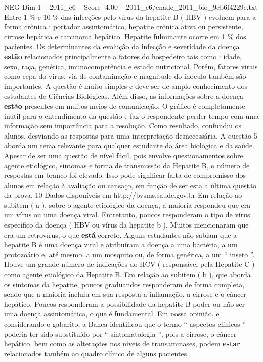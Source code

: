 \begin{textsample}{NEG Dim 1 – 2011\_c6 – Score -4.00 – 2011\_c6/enade\_2011\_bio\_9cb6f4229e.txt}
Entre 1 \% e 10 \% das infecções pelo vírus da hepatite B ( HBV ) evoluem para a forma crônica : portador assintomático, hepatite crônica ativa ou persistente, cirrose hepática e carcinoma hepático.
Hepatite fulminante ocorre em 1 \% dos pacientes.
Os determinantes da evolução da infecção e severidade da doença \textbf{estão} relacionados principalmente a fatores do hospedeiro tais como : idade, sexo, raça, genética, imunocompetência e estado nutricional.
Porém, fatores virais como cepa do vírus, via de contaminação e magnitude do inóculo também são importantes.
A questão é muito simples e deve ser de amplo conhecimento dos estudantes de Ciências Biológicas.
Além disso, as informações sobre a doença \textbf{estão} presentes em muitos meios de comunicação.
O gráfico é completamente inútil para o entendimento da questão e faz o respondente perder tempo com uma informação sem importância para a resolução.
Como resultado, confundiu os alunos, desviando as respostas para uma interpretação desnecessária.
A questão 5 aborda um tema relevante para qualquer estudante da área biológica e da saúde.
Apesar de ser uma questão de nível fácil, pois envolve questionamentos sobre agente etiológico, sintomas e forma de transmissão da Hepatite B, o número de respostas em branco foi elevado.
Isso pode significar falta de compromisso dos alunos em relação à avaliação ou cansaço, em função de ser esta a última questão da prova. 10 Dados disponíveis em http://bvsms.saude.gov.br Em relação ao subitem ( a ), sobre o agente etiológico da doença, a maioria respondeu que era um vírus ou uma doença viral.
Entretanto, poucos responderam o tipo de vírus específico da doença ( HBV ou vírus da hepatite b ).
Muitos mencionaram que era um retrovírus, o que \textbf{está} correto.
Alguns estudantes não sabiam que a hepatite B é uma doença viral e atribuíram a doença a uma bactéria, a um protozoário e, até mesmo, a um mosquito ou, de forma genérica, a um “ inseto ”.
Houve um grande número de indicações do HCV ( responsável pela Hepatite C ) como agente etiológico da Hepatite B.
Em relação ao subitem ( b ), que aborda os sintomas da hepatite, poucos graduandos responderam de forma completa, sendo que a maioria incluiu em sua resposta a inflamação, a cirrose e o câncer hepático.
Poucos responderam a possibilidade da hepatite B poder ou não ser uma doença assintomática, o que é fundamental.
Em nossa opinião, e considerando o gabarito, a Banca identificou que o termo “ aspectos clínicos ” poderia ter sido substituído por “ sintomatologia ”, pois a cirrose, o câncer hepático, bem como as alterações nos níveis de transaminases, podem \textbf{estar} relacionados também ao quadro clínico de alguns pacientes.

\end{textsample}
